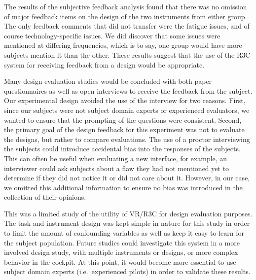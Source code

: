 The results of the subjective feedback analysis found that there was no omission of major feedback items on the design of the two instruments from either group.
The only feedback comments that did not transfer were the fatigue issues, and of course technology-specific issues.
We did discover that some issues were mentioned at differing frequencies, which is to say, one group would have more subjects mention it than the other.
These results suggest that the use of the R3C system for receiving feedback from a design would be appropriate.

Many design evaluation studies would be concluded with both paper questionnaires as well as open interviews to receive the feedback from the subject.
Our experimental design avoided the use of the interview for two reasons.
First, since our subjects were not subject domain experts or experienced evaluators, we wanted to ensure that the prompting of the questions were consistent.
Second, the primary goal of the design feedback for this experiment was not to evaluate the designs, but rather to compare evaluations.
The use of a proctor interviewing the subjects could introduce accidental bias into the responses of the subjects.
This can often be useful when evaluating a new interface, for example, an interviewer could ask subjects about a flaw they had not mentioned yet to determine if they did not notice it or did not care about it.
However, in our case, we omitted this additional information to ensure no bias was introduced in the collection of their opinions.

This was a limited study of the utility of VR/R3C for design evaluation purposes.
The task and instrument design was kept simple in nature for this study in order to limit the amount of confounding variables as well as keep it easy to learn for the subject population.
Future studies could investigate this system in a more involved design study, with multiple instruments or designs, or more complex behavior in the cockpit.
At this point, it would become more essential to use subject domain experts (i.e.\ experienced pilots) in order to validate these results.

